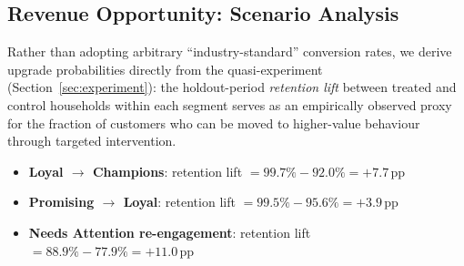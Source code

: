\documentclass[conference]{IEEEtran}
\begin{document}
\begin{table}[H]
\centering
\caption{Proposed marketing strategies per segment.}
\label{tab:strategies}
\end{table}

\subsection{Revenue Opportunity: Scenario Analysis}

Rather than adopting arbitrary ``industry-standard'' conversion rates,
we derive upgrade probabilities directly from the quasi-experiment
(Section~\ref{sec:experiment}): the holdout-period \emph{retention
lift} between treated and control households within each segment
serves as an empirically observed proxy for the fraction of customers
who can be moved to higher-value behaviour through targeted
intervention.

\begin{itemize}
  \item \textbf{Loyal $\rightarrow$ Champions}: retention lift
        $= 99.7\% - 92.0\% = +7.7\,\text{pp}$
  \item \textbf{Promising $\rightarrow$ Loyal}: retention lift
        $= 99.5\% - 95.6\% = +3.9\,\text{pp}$
  \item \textbf{Needs Attention re-engagement}: retention lift
        $= 88.9\% - 77.9\% = +11.0\,\text{pp}$
\end{itemize}
\end{document}
